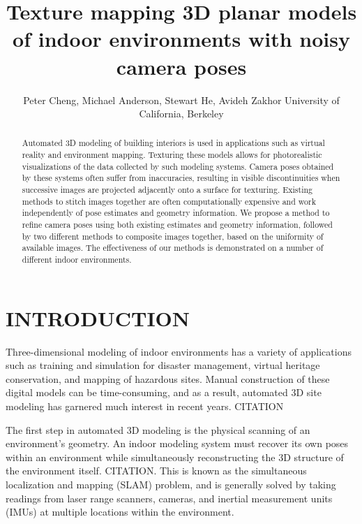 \documentclass[]{spie}  %
\title{Texture mapping 3D planar models of indoor environments with noisy camera poses}
\author{Peter Cheng, Michael Anderson, Stewart He, Avideh Zakhor
\skiplinehalf
University of California, Berkeley\\
}
\begin{document}
\maketitle

\begin{abstract}
  Automated 3D modeling of building interiors is used in applications
  such as virtual reality and environment mapping. Texturing these
  models allows for photorealistic visualizations of the data
  collected by such modeling systems. Camera poses obtained by these
  systems often suffer from inaccuracies, resulting in visible
  discontinuities when successive images are projected adjacently onto
  a surface for texturing. Existing methods to stitch images together
  are often computationally expensive and work independently of pose
  estimates and geometry information. We propose a method to refine
  camera poses using both existing estimates and geometry information,
  followed by two different methods to composite images together,
  based on the uniformity of available images. The effectiveness of
  our methods is demonstrated on a number of different indoor
  environments.
\end{abstract}



\section{INTRODUCTION}
\label{sec:introduction} %
Three-dimensional modeling of indoor environments has a variety of
applications such as training and simulation for disaster management,
virtual heritage conservation, and mapping of hazardous sites. Manual
construction of these digital models can be time-consuming, and as a
result, automated 3D site modeling has garnered much interest in
recent years. CITATION

The first step in automated 3D modeling is the physical scanning of
an environment's geometry. An indoor modeling system must recover its
own poses within an environment while simultaneously reconstructing
the 3D structure of the environment itself. CITATION. This is known as
the simultaneous localization and mapping (SLAM) problem, and is
generally solved by taking readings from laser range scanners,
cameras, and inertial measurement units (IMUs) at multiple locations
within the environment.
\end{document}
